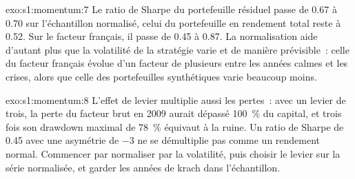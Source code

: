 \begin{solution}{exo:s1:momentum:7}
Le ratio de Sharpe du portefeuille résiduel passe de 0.67 à 0.70 sur l'échantillon normalisé, celui du portefeuille en rendement total reste à 0.52. Sur le facteur français, il passe de 0.45
à 0.87. La normalisation aide d'autant plus que la volatilité de la stratégie varie et de manière prévisible~: celle du facteur français évolue d'un facteur
de plusieurs entre les années calmes et les crises, alors que celle des portefeuilles synthétiques varie beaucoup moins.
\end{solution}

\begin{solution}{exo:s1:momentum:8}
L'effet de levier multiplie aussi les pertes~: avec un levier de trois, la perte du facteur brut en 2009 aurait dépassé 100~\% du capital, et trois fois son drawdown maximal
de 78~\% équivaut à la ruine. Un ratio de Sharpe de 0.45 avec une asymétrie de $-3$ ne se démultiplie pas comme un rendement normal. Commencer par normaliser par la volatilité, puis choisir
le levier sur la série normalisée, et garder les années de krach dans l'échantillon.
\end{solution}

